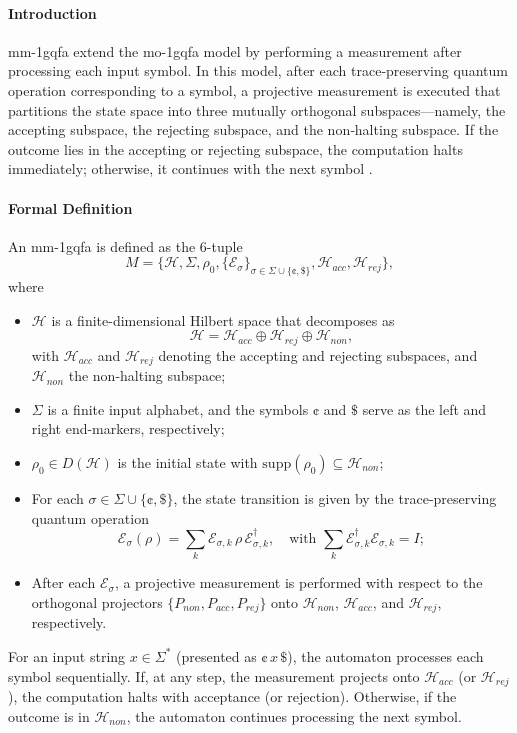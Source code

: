 \paragraph{Introduction} 
\gls{mm-1gqfa} extend the \gls{mo-1gqfa} model by performing a measurement after processing each input symbol. In this model, after each trace‐preserving quantum operation corresponding to a symbol, a projective measurement is executed that partitions the state space into three mutually orthogonal subspaces—namely, the accepting subspace, the rejecting subspace, and the non‐halting subspace. If the outcome lies in the accepting or rejecting subspace, the computation halts immediately; otherwise, it continues with the next symbol \cite{li2012characterizations}.

\paragraph{Formal Definition} 
An \gls{mm-1gqfa} is defined as the 6-tuple
\[
M = \{ \mathcal{H},\Sigma,\rho_0,\{\mathcal{E}_\sigma\}_{\sigma\in\Sigma\cup\{\cent,\$\}},\mathcal{H}_{acc},\mathcal{H}_{rej}\},
\]
where
\begin{itemize}
  \item $\mathcal{H}$ is a finite-dimensional Hilbert space that decomposes as
  \[
  \mathcal{H}=\mathcal{H}_{acc}\oplus \mathcal{H}_{rej}\oplus \mathcal{H}_{non},
  \]
  with $\mathcal{H}_{acc}$ and $\mathcal{H}_{rej}$ denoting the accepting and rejecting subspaces, and $\mathcal{H}_{non}$ the non-halting subspace;
  \item $\Sigma$ is a finite input alphabet, and the symbols $\cent$ and $\$$ serve as the left and right end-markers, respectively;
  \item $\rho_0\in D(\mathcal{H})$ is the initial state with $\mathrm{supp}(\rho_0)\subseteq \mathcal{H}_{non}$;
  \item For each $\sigma\in\Sigma\cup\{\cent,\$\}$, the state transition is given by the trace‐preserving quantum operation 
  \[
  \mathcal{E}_\sigma(\rho)=\sum_{k} \mathcal{E}_{\sigma,k}\,\rho\,\mathcal{E}_{\sigma,k}^\dagger,\quad \text{with } \sum_{k} \mathcal{E}_{\sigma,k}^\dagger \mathcal{E}_{\sigma,k}=I;
  \]
  \item After each $\mathcal{E}_\sigma$, a projective measurement is performed with respect to the orthogonal projectors $\{P_{non},P_{acc},P_{rej}\}$ onto $\mathcal{H}_{non}$, $\mathcal{H}_{acc}$, and $\mathcal{H}_{rej}$, respectively.
\end{itemize}
For an input string $x\in\Sigma^*$ (presented as $\cent\,x\,\$$), the automaton processes each symbol sequentially. If, at any step, the measurement projects onto $\mathcal{H}_{acc}$ (or $\mathcal{H}_{rej}$), the computation halts with acceptance (or rejection). Otherwise, if the outcome is in $\mathcal{H}_{non}$, the automaton continues processing the next symbol.

